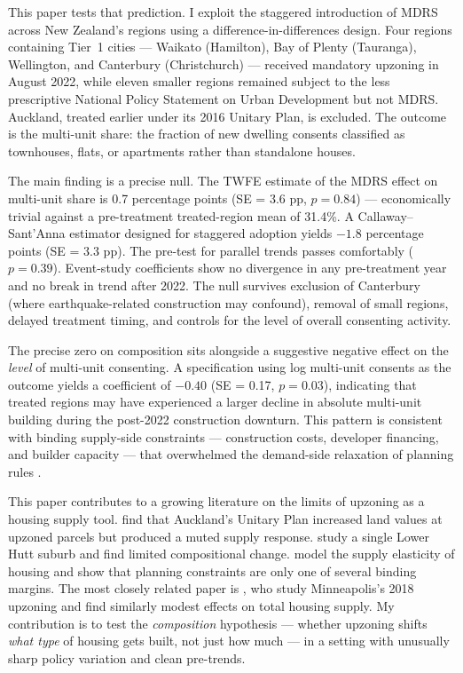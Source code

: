 \documentclass[12pt]{article}
\begin{document}
This paper tests that prediction. I exploit the staggered introduction of MDRS across New Zealand's regions using a difference-in-differences design. Four regions containing Tier~1 cities --- Waikato (Hamilton), Bay of Plenty (Tauranga), Wellington, and Canterbury (Christchurch) --- received mandatory upzoning in August 2022, while eleven smaller regions remained subject to the less prescriptive National Policy Statement on Urban Development but not MDRS. Auckland, treated earlier under its 2016 Unitary Plan, is excluded. The outcome is the multi-unit share: the fraction of new dwelling consents classified as townhouses, flats, or apartments rather than standalone houses.

The main finding is a precise null. The TWFE estimate of the MDRS effect on multi-unit share is 0.7 percentage points (SE = 3.6 pp, $p = 0.84$) --- economically trivial against a pre-treatment treated-region mean of 31.4\%. A Callaway--Sant'Anna estimator designed for staggered adoption yields $-1.8$ percentage points (SE = 3.3 pp). The pre-test for parallel trends passes comfortably ($p = 0.39$). Event-study coefficients show no divergence in any pre-treatment year and no break in trend after 2022. The null survives exclusion of Canterbury (where earthquake-related construction may confound), removal of small regions, delayed treatment timing, and controls for the level of overall consenting activity.

The precise zero on composition sits alongside a suggestive negative effect on the \textit{level} of multi-unit consenting. A specification using log multi-unit consents as the outcome yields a coefficient of $-0.40$ (SE = 0.17, $p = 0.03$), indicating that treated regions may have experienced a larger decline in absolute multi-unit building during the post-2022 construction downturn. This pattern is consistent with binding supply-side constraints --- construction costs, developer financing, and builder capacity --- that overwhelmed the demand-side relaxation of planning rules \citep{glaeser2018economic}.

This paper contributes to a growing literature on the limits of upzoning as a housing supply tool. \citet{greenaway2023upzoning} find that Auckland's Unitary Plan increased land values at upzoned parcels but produced a muted supply response. \citet{maltman2024medium} study a single Lower Hutt suburb and find limited compositional change. \citet{kulish2012urban} model the supply elasticity of housing and show that planning constraints are only one of several binding margins. The most closely related paper is \citet{been2023supply}, who study Minneapolis's 2018 upzoning and find similarly modest effects on total housing supply. My contribution is to test the \textit{composition} hypothesis --- whether upzoning shifts \textit{what type} of housing gets built, not just how much --- in a setting with unusually sharp policy variation and clean pre-trends.
\end{document}
